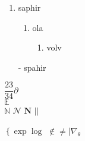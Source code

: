 \documentclass[11pt,a4paper,landscape]{book}
\begin{document}
	
	
	\begin{enumerate}
		\item  saphir
		\begin{enumerate}
			\item ola
			\begin{enumerate}
				\item volv
			\end{enumerate}
		\end{enumerate}
	\end{enumerate}
	\begin{itemize}
		\item[-] spahir
	\end{itemize}

$\dfrac{23}{34} \partial$\\

$\mathbb{E}$\\
$\mathbb{N}$
$\mathcal{N}$
$\mathbf{N}$
$\left|\right|$
	
$\left\{\right. \exp\log$
$\notin$$\neq|\nabla_\theta$

	
	
\end{document}
